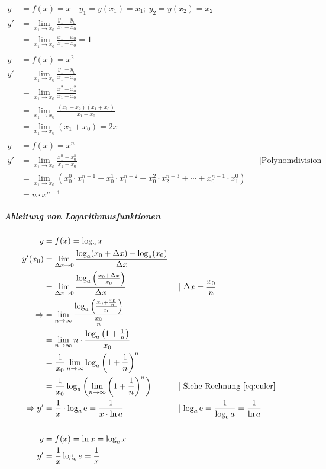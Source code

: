 \begin{align*}
    y &= f(x) = x \quad y_1 = y(x_1) = x_1;\ y_2 = y(x_2) = x_2 \\
    y' &= \lim_{x_1 \rightarrow x_0} \frac{y_1 - y_0}{x_1 - x_0} \\
    &= \lim_{x_1 \rightarrow x_0} \frac{x_1 - x_0}{x_1 - x_0} = 1 \\
    \\
    y &= f(x) = x^2 \\
    y' &= \lim_{x_1 \rightarrow x_0} \frac{y_1 - y_0}{x_1 - x_0} \\
    &= \lim_{x_1 \rightarrow x_0} \frac{x_1^2 - x_0^2}{x_1 - x_0} \\
    &= \lim_{x_1 \rightarrow x_0} \frac{(x_1 - x_2)(x_1 + x_0)}{x_1 - x_0} \\
    &= \lim_{x_1 \rightarrow x_0} (x_1 + x_0) = 2x \\
    \\
    y &= f(x) = x^n \\
    y' &= \lim_{x_1 \rightarrow x_0} \frac{x_1^n - x_0^n}{x_1 - x_0}  &&\mid \text{Polynomdivision} \\
    &= \lim_{x_1 \rightarrow x_0} (x_0^0 \cdot x_1^{n-1} + x_0^1 \cdot x_1^{n-2} + x_0^2 \cdot x_2^{n-3} + \cdots + x_0^{n-1} \cdot x_1^0)\\
    &= n \cdot x^{n-1}
\end{align*}

\subparagraph{Ableitung von Logarithmusfunktionen}

\begin{align*}
    y &= f(x) = \log_a x \\
    y'(x_0) &= \lim_{\Delta x \rightarrow 0} \frac{\log_a(x_0 + \Delta x) - \log_a(x_0)}{\Delta x} \\
    &= \lim_{\Delta x \rightarrow 0} \frac{\log_a \left( \frac{x_0 + \Delta x}{x_0} \right)}{\Delta x} &&\mid \Delta x = \frac{x_0}{n} \\
    \Rightarrow &= \lim_{n \rightarrow{} \infty} \frac{\log_a \left( \frac{x_0 + \frac{x_0}{n}} {x_0} \right)}{\frac{x_0}{n}} \\
    &= \lim_{n \rightarrow{} \infty} n \cdot \frac{\log_a \left( 1 + \frac{1}{n} \right)}{x_0} \\
    &= \frac{1}{x_0} \lim_{n \rightarrow{} \infty} \log_a {\left( 1 + \frac{1}{n} \right)}^{n} \\
    &= \frac{1}{x_0} \log_a \left( \lim_{n \rightarrow{} \infty} {\left( 1 + \frac{1}{n} \right)}^n \right) &&\mid \text{Siehe Rechnung~\ref{eq:euler}} \\
    \Rightarrow y' &= \frac{1}{x} \cdot \log_a \mathop{}\!\mathrm{e} = \frac{1}{x \cdot \ln a} &&\mid \log_a \mathop{}\!\mathrm{e} = \frac{1}{\log_{\mathop{}\!\mathrm{e}} a} = \frac{1}{\ln a} \\
    \\
    y &= f(x) = \ln x = \log_{\mathop{}\!\mathrm{e}} x \\
    y' &= \frac{1}{x} \log_{\mathop{}\!\mathrm{e}} e = \frac{1}{x}
\end{align*}


